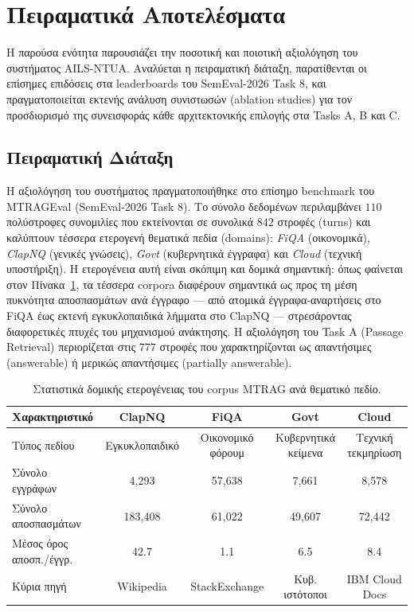 \section{Πειραματικά Αποτελέσματα}

Η παρούσα ενότητα παρουσιάζει την ποσοτική και ποιοτική αξιολόγηση του συστήματος AILS-NTUA. Αναλύεται η πειραματική διάταξη, παρατίθενται οι επίσημες επιδόσεις στα leaderboards του SemEval-2026 Task 8, και πραγματοποιείται εκτενής ανάλυση συνιστωσών (ablation studies) για τον προσδιορισμό της συνεισφοράς κάθε αρχιτεκτονικής επιλογής στα Tasks A, B και C.

\subsection{Πειραματική Διάταξη}

Η αξιολόγηση του συστήματος πραγματοποιήθηκε στο επίσημο benchmark του MTRAGEval (SemEval-2026 Task 8). Το σύνολο δεδομένων περιλαμβάνει $110$ πολύστροφες συνομιλίες που εκτείνονται σε συνολικά $842$ στροφές (turns) και καλύπτουν τέσσερα ετερογενή θεματικά πεδία (domains): \textit{FiQA} (οικονομικά), \textit{ClapNQ} (γενικές γνώσεις), \textit{Govt} (κυβερνητικά έγγραφα) και \textit{Cloud} (τεχνική υποστήριξη). Η ετερογένεια αυτή είναι σκόπιμη και δομικά σημαντική: όπως φαίνεται στον Πίνακα~\ref{tab:corpus-greek}, τα τέσσερα corpora διαφέρουν σημαντικά ως προς τη μέση πυκνότητα αποσπασμάτων ανά έγγραφο — από ατομικά έγγραφα-αναρτήσεις στο FiQA έως εκτενή εγκυκλοπαιδικά λήμματα στο ClapNQ — στρεσάροντας διαφορετικές πτυχές του μηχανισμού ανάκτησης. Η αξιολόγηση του Task A (Passage Retrieval) περιορίζεται στις $777$ στροφές που χαρακτηρίζονται ως απαντήσιμες (answerable) ή μερικώς απαντήσιμες (partially answerable).

\begin{table}[ht]
\centering
\small
\begin{tabular}{lcccc}
\toprule
\textbf{Χαρακτηριστικό} & \textbf{ClapNQ} & \textbf{FiQA} & \textbf{Govt} & \textbf{Cloud} \\
\midrule
Τύπος πεδίου & Εγκυκλοπαιδικό & Οικονομικό φόρουμ & Κυβερνητικά κείμενα & Τεχνική τεκμηρίωση \\
Σύνολο εγγράφων & 4{,}293 & 57{,}638 & 7{,}661 & 8{,}578 \\
Σύνολο αποσπασμάτων & 183{,}408 & 61{,}022 & 49{,}607 & 72{,}442 \\
Μέσος όρος αποσπ./έγγρ. & 42.7 & 1.1 & 6.5 & 8.4 \\
Κύρια πηγή & Wikipedia & StackExchange & Κυβ. ιστότοποι & IBM Cloud Docs \\
\bottomrule
\end{tabular}
\caption{Στατιστικά δομικής ετερογένειας του corpus MTRAG ανά θεματικό πεδίο.}
\label{tab:corpus-greek}
\end{table}

